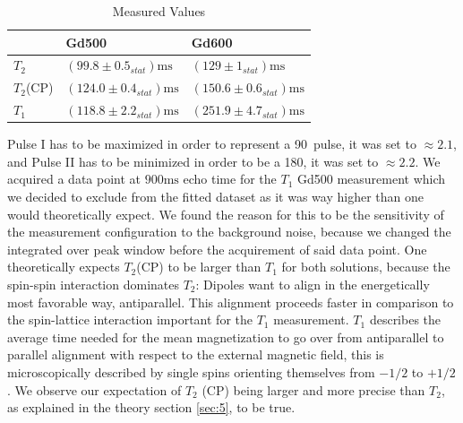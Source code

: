\begin{table}[h]
	\centering
	\begin{tabular}{lll}
		\toprule
		 & Gd500 & Gd600 \\
		\midrule
		$T_2$ & $\left(99.8 \pm 0.5_{stat}\right)\mathrm{ms}$ & $\left(129 \pm 1_{stat}\right)\mathrm{ms}$\\
		
		$T_2$(CP) & $\left(124.0 \pm 0.4_{stat}\right)\mathrm{ms}$ & $\left(150.6 \pm 0.6_{stat}\right)\mathrm{ms}$\\
		
		$T_1$   & $\left(118.8 \pm 2.2_{stat}\right)\mathrm{ms}$ &$ \left(251.9 \pm 4.7_{stat}\right)\mathrm{ms}$\\
		
		\bottomrule
	\end{tabular}
	\caption{Measured Values}
	\label{tab:1}
\end{table}
\noindent
Pulse I has to be maximized in order to represent a 90\textdegree\, pulse, it was set to $\approx 2.1$, and Pulse II has to be minimized in order to be a 180\textdegree, it was set to $\approx 2.2$.
We acquired a data point at $900 \mathrm{ms}$ echo time for the $T_1$ Gd500 measurement which we decided to exclude from the fitted dataset as it was way higher than one would theoretically expect. We found the reason for this to be the sensitivity of the measurement configuration to the background noise, because we changed the integrated over peak window before the acquirement of said data point.
One theoretically expects $T_2$(CP) to be larger than $T_1$ for both solutions,
because the spin-spin interaction dominates $T_2$: Dipoles want to align in the energetically most favorable way, antiparallel. This alignment proceeds faster in comparison to the spin-lattice interaction important for the $T_1$ measurement. $T_1$ describes the average time needed for the mean magnetization to go over from antiparallel to parallel alignment with respect to the external magnetic field, this is microscopically described by single spins orienting themselves from $-1/2$ to $+1/2$.\cite{manual} We observe our expectation of $T_2$ (CP) being larger and more precise than $T_2$, as explained in the theory section \ref{sec:5}, to be true.
